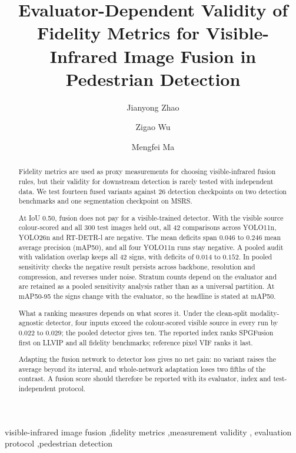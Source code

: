 \documentclass[preprint,10pt]{elsarticle}
\begin{document}
\begin{frontmatter}

\title{Evaluator-Dependent Validity of Fidelity Metrics for Visible-Infrared Image
Fusion in Pedestrian Detection}

\author[1]{Jianyong Zhao}
\author[1]{Zigao Wu}
\author[1]{Mengfei Ma}

\begin{abstract}
Fidelity metrics are used as proxy measurements for choosing visible-infrared fusion
rules, but their validity for downstream detection is rarely tested with independent
data. We test fourteen fused variants against 26 detection checkpoints on two detection
benchmarks and one segmentation checkpoint on MSRS.

At IoU 0.50, fusion does not pay for a visible-trained detector.
With the visible source colour-scored and all 300 test images held out, all 42
comparisons across YOLO11n, YOLO26n and RT-DETR-l are negative. The
mean deficits span $0.046$ to $0.246$ mean average precision (mAP50), and all four
YOLO11n runs stay negative. A pooled audit with
validation overlap keeps all 42 signs, with deficits of $0.014$ to $0.152$. In pooled
sensitivity checks the negative result persists across backbone, resolution and
compression, and reverses under noise. Stratum counts depend on the evaluator and are retained as a pooled
sensitivity analysis rather than as a universal partition. At mAP50-95 the signs
change with the evaluator, so the headline is stated at mAP50.

What a ranking measures depends on what scores it. Under the clean-split
modality-agnostic detector, four inputs exceed the colour-scored visible source in
every run by $0.022$ to $0.029$; the pooled detector gives ten. The reported index ranks
SPGFusion first on LLVIP and all fidelity benchmarks; reference pixel VIF ranks it last.

Adapting the fusion network to detector loss gives no net gain: no variant raises the
average beyond its interval, and whole-network adaptation loses two fifths of the
contrast. A fusion score should therefore be reported with its evaluator, index and
test-independent protocol.

\end{abstract}

\begin{keyword}
visible-infrared image fusion \sep fidelity metrics \sep measurement validity \sep
evaluation protocol \sep pedestrian detection
\end{keyword}

\end{frontmatter}
\end{document}
